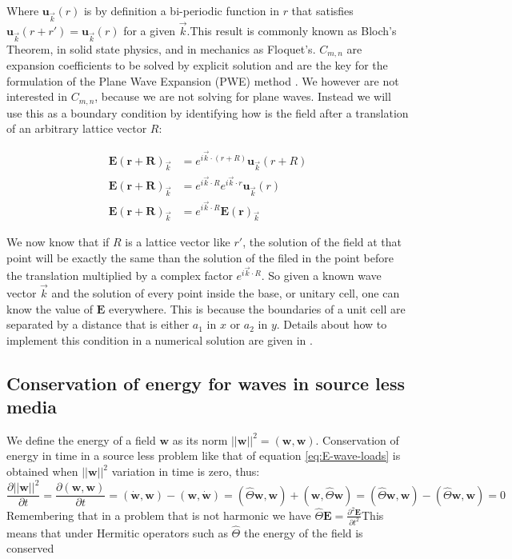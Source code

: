 Where $\mathbf{u}_{\vec{k}}(r)$ is by definition a bi-periodic function in $r$ that satisfies  $\mathbf{u}_{\vec{k}}(r+r') = \mathbf{u}_{\vec{k}}(r)$ for a given $\vec{k}$.This result is commonly known as Bloch's Theorem, in solid state physics, and in mechanics as Floquet's. $C_{m,n}$ are expansion coefficients to be solved by explicit solution and are the key for the formulation of the Plane Wave Expansion (PWE) method \cite{Loaiza2011,Joannopoulos2008,StevenG.Johnson2001}. We however are not interested in $C_{m,n}$, because we are not solving for plane waves. Instead we will use this as a boundary condition by identifying how is the field after a translation of an arbitrary lattice vector $R$:

\begin{align}
\mathbf{E(r+R)}_{\vec{k}} &= e^{i\vec{k}\cdot (r+R)} \mathbf{u}_{\vec{k}}(r+R)\\
\mathbf{E(r+R)}_{\vec{k}} &= e^{i\vec{k}\cdot R}e^{i\vec{k}\cdot r} \mathbf{u}_{\vec{k}}(r)\\
\mathbf{E(r+R)}_{\vec{k}} &= e^{i\vec{k}\cdot R}\mathbf{E(r)}_{\vec{k}}
\end{align}

We now know that if $R$ is a lattice vector like $r'$, the solution of the field at that point will be exactly the same than the solution of the filed in the point before the translation multiplied by a complex factor $e^{i\vec{k}\cdot R}$. So given a known wave vector $\vec{k}$ and the solution of every point inside the base, or unitary cell, one can know the value of $\mathbf{E}$ everywhere. This is because the boundaries of a unit cell are separated by a distance that is either $a_1$ in $x$ or $a_2$ in $y$. Details about how to implement this condition in a numerical solution are given in \cite{Guarin2012}.

\subsection{Conservation of energy for waves in source less media}

We define the energy of a field $\mathbf{w}$ as its norm $||\mathbf{w}||^2 = \left(\mathbf{w},\mathbf{w}\right)$.
Conservation of energy in time in a source less problem like that of equation \ref{eq:E-wave-loads} is obtained when $||\mathbf{w}||^2$ variation in time is zero, thus:
\begin{equation}
\frac{\partial ||\mathbf{w}||^2}{\partial t} =\frac{\partial \left(\mathbf{w},\mathbf{w}\right)}{\partial t} = \left(\dot{\mathbf{w}},\mathbf{w}\right)-\left(\mathbf{w},\dot{\mathbf{w}}\right) = \left(\hat{\Theta}\mathbf{w},\mathbf{w}\right)+\left(\mathbf{w},\hat{\Theta}\mathbf{w}\right) = \left(\hat{\Theta}\mathbf{w},\mathbf{w}\right)-\left(\hat{\Theta}\mathbf{w},\mathbf{w}\right) = 0
\end{equation}
Remembering that in a problem that is not harmonic we have $\hat{\Theta}\mathbf{E} = \frac{\partial^2 \mathbf{E}}{\partial t^2}$This means that under Hermitic operators such as $\hat{\Theta}$ the energy of the field is conserved
